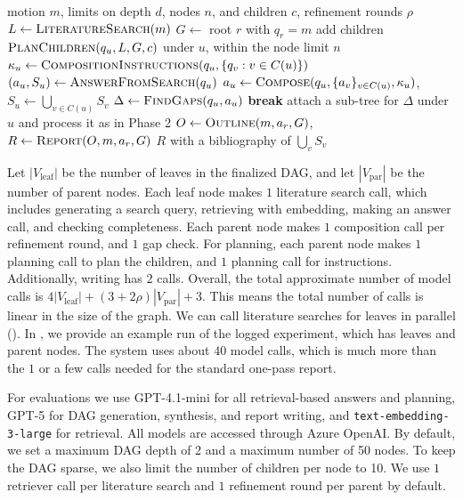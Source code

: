 \begin{algorithm}[t]
\caption{\sys{}}
\label{alg:pipeline}
\begin{algorithmic}[1]
\Require motion $m$, limits on depth $d$, nodes $n$, and children $c$, refinement rounds $\rho$
\State $L \gets \textsc{LiteratureSearch}(m)$ 
\State $G \gets$ root $r$ with $q_r = m$
 
    \State add children $\textsc{PlanChildren}(q_u, L, G, c)$ under $u$, within the node limit $n$
  \EndFor
\EndFor
{} $\kappa_u \gets \textsc{CompositionInstructions}(q_u, \{q_v : v \in C(u)\})$ \EndFor
{} 
    \State $(a_u, S_u) \gets \textsc{AnswerFromSearch}(q_u)$
  \Else
      \State $a_u \gets \textsc{Compose}(q_u, \{a_v\}_{v \in C(u)}, \kappa_u)$, \quad $S_u \gets \bigcup_{v \in C(u)} S_v$
      \State $\Delta \gets \textsc{FindGaps}(q_u, a_u)$
       \textbf{break} \EndIf
      \State attach a sub-tree for $\Delta$ under $u$ and process it as in Phase 2
    \EndFor
  \EndIf
\EndFor
\State $O \gets \textsc{Outline}(m, a_r, G)$, \quad $R \gets \textsc{Report}(O, m, a_r, G)$ 
\State \Return $R$ with a bibliography of $\bigcup_v S_v$
\end{algorithmic}
\end{algorithm}

Let $|V_\text{leaf}|$ be the number of leaves in the finalized DAG, and let $|V_\text{par}|$ be the number of parent nodes. Each leaf node makes $1$ literature search call, which includes generating a search query, retrieving with embedding, making an answer call, and checking completeness. Each parent node makes $1$ composition call per refinement round, and $1$ gap check. For planning, each parent node makes $1$ planning call to plan the children, and $1$ planning call for instructions. Additionally, writing has $2$ calls. Overall, the total approximate number of model calls is $4|V_\text{leaf}| + (3+2\rho)|V_\text{par}| + 3$. This means the total number of calls is linear in the size of the graph. We can call literature searches for leaves in parallel (). In , we provide an example run of the logged experiment, which has \dagLeaves{} leaves and \dagParents{} parent nodes. The system uses about $40$ model calls, which is much more than the $1$ or a few calls needed for the standard one-pass report.

For evaluations we use GPT-4.1-mini for all retrieval-based answers and planning, GPT-5 for DAG generation, synthesis, and report writing, and \texttt{text-embedding-3-large} for retrieval. All models are accessed through Azure OpenAI. By default, we set a maximum DAG depth of 2 and a maximum number of 50 nodes. To keep the DAG sparse, we also limit the number of children per node to 10. We use $1$ retriever call per literature search and $1$ refinement round per parent by default.
